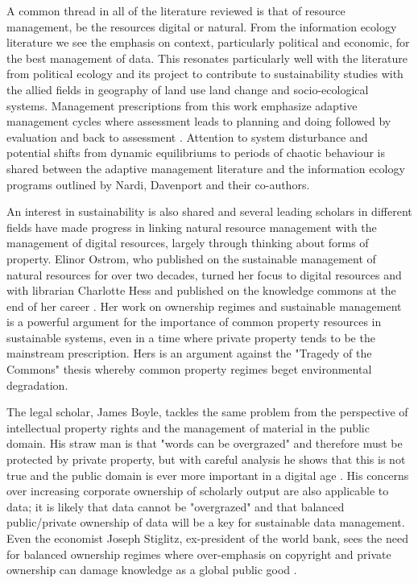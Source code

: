 A common thread in all of the literature reviewed is that of resource management, be the resources digital or natural. From the information ecology literature we see the emphasis on context, particularly political and economic, for the best management of data. This resonates particularly well with the literature from political ecology and its project to contribute to sustainability studies with the allied fields in geography of land use land change and socio-ecological systems. Management prescriptions from this work emphasize adaptive management cycles where assessment leads to planning and doing followed by evaluation and back to assessment \citep{holling_1978,liu_etal_2007}. Attention to system disturbance and potential shifts from dynamic equilibriums to periods of chaotic behaviour is shared between the adaptive management literature and the information ecology programs outlined by Nardi, Davenport and their co-authors. 

An interest in sustainability is also shared and several leading scholars in different fields have made progress in linking natural resource management with the management of digital resources, largely through thinking about forms of property. Elinor Ostrom, who published on the sustainable management of natural resources for over two decades, turned her focus to digital resources and with librarian Charlotte Hess and published on the knowledge commons at the end of her career \citep{hess_2006}. Her work on ownership regimes and sustainable management is a powerful argument for the importance of common property resources in sustainable systems, even in a time where private property tends to be the mainstream prescription. Hers is an argument against the "Tragedy of the Commons" thesis whereby common property regimes beget environmental degradation.

The legal scholar, James Boyle, tackles the same problem from the perspective of intellectual property rights and the management of material in the public domain. His straw man is that "words can be overgrazed" and therefore must be protected by private property, but with careful analysis he shows that this is not true and the public domain is ever more important in a digital age \citep[][footnote 15 on p. 5]{boyle_2003}. His concerns over increasing corporate ownership of scholarly output are also applicable to data; it is likely that data cannot be "overgrazed" and that balanced public/private ownership of data will be a key for sustainable data management. Even the economist Joseph Stiglitz, ex-president of the world bank, sees the need for balanced ownership regimes where over-emphasis on copyright and private ownership can damage knowledge as a global public good \citep{stiglitz_1999}.

